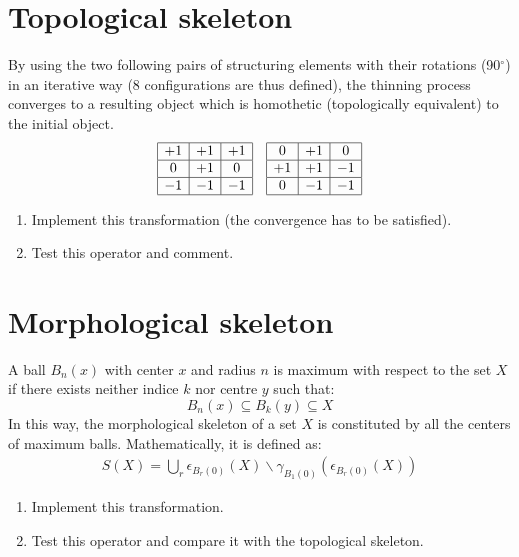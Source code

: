 \section{Topological skeleton}
By using the two following pairs of structuring elements with their rotations (90$^\circ$) in an iterative way (8 configurations are thus defined), the thinning process converges to a resulting object which is homothetic (topologically equivalent) to the initial object.
$$\begin{array}{|c|c|c|}
	\hline
	+1&+1&+1\\\hline
	0&+1&0\\\hline
	-1&-1&-1\\\hline
	\end{array}
	\quad
\begin{array}{|c|c|c|}
	\hline
	0&+1&0\\\hline
	+1&+1&-1\\\hline
	0&-1&-1\\\hline
	\end{array}	
	$$
	
	\begin{qbox}
\begin{enumerate}
	\item Implement this transformation (the convergence has to be satisfied).
	\item Test this operator and comment.
\end{enumerate}
\end{qbox}

\section{Morphological skeleton}
A ball $B_n(x)$ with center $x$ and radius $n$ is maximum with respect to the set $X$ if there exists neither indice $k$ nor centre $y$ such that:
$$
B_n(x)\subseteq B_k(y) \subseteq X
$$
In this way, the morphological skeleton of a set $X$ is constituted by all the centers of maximum balls. Mathematically, it is defined as: 
\begin{eqnarray}
S(X)=\bigcup_{r} \epsilon_{B_r(0)}(X) \backslash \gamma_{B_1(0)}(\epsilon_{B_r(0)}(X))
\end{eqnarray}

\begin{qbox}
\begin{enumerate}
	\item Implement this transformation.
	\item Test this operator and compare it with the topological skeleton.
\end{enumerate}
\end{qbox}

